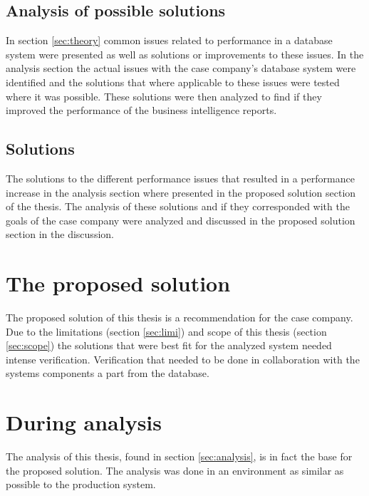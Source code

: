 \documentclass{cslthse-msc}
\begin{document}
\subsection{Analysis of possible solutions}
In section \ref{sec:theory} common issues related to performance in a database system were presented as well as solutions or improvements to these issues. In the analysis section the actual issues with the case company's database system were identified and the solutions that where applicable to these issues were tested where it was possible. These solutions were then analyzed to find if they improved the performance of the business intelligence reports.

\subsection{Solutions}
The solutions to the different performance issues that resulted in a performance increase in the analysis section where presented in the proposed solution section of the thesis. The analysis of these solutions and if they corresponded with the goals of the case company were analyzed and discussed in the proposed solution section in the discussion.

\section{The proposed solution}
The proposed solution of this thesis is a recommendation for the case company. Due to the limitations (section \ref{sec:limi}) and scope of this thesis (section \ref{sec:scope}) the solutions that were best fit for the analyzed system needed intense verification. Verification that needed to be done in collaboration with the systems components a part from the database.  

\section{During analysis}
The analysis of this thesis, found in section \ref{sec:analysis}, is in fact the base for the proposed solution. The analysis was done in an environment as similar as possible to the production system. 
\\\\\\\\ 
\end{document}
